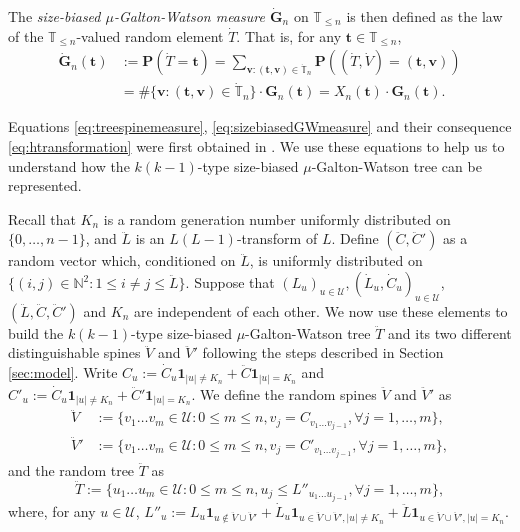 \documentclass[12pt,a4paper]{amsart}
\numberwithin{equation}{section}
\begin{document}
	The \emph{size-biased $\mu$-Galton-Watson measure $\dot {\mathbf G}_n$} on $\mathbb T_{\leq n}$ is then defined as the law of the $\mathbb T_{\leq n}$-valued random element $\dot T$. That is, for any $ \mathbf t \in\mathbb T_{\leq n}$,
\begin{equation}
\label{eq:sizebiasedGWmeasure}
\begin{split}
		\dot {\mathbf G}_n( \mathbf t )
	&:= \mathbf P(\dot T= \mathbf t )
	= \sum_{ \mathbf v:( \mathbf t , \mathbf v)\in \dot{\mathbb T}_n} \mathbf P((\dot T,\dot V)=( \mathbf t , \mathbf v))
	\\&= \#\{ \mathbf v:( \mathbf t , \mathbf v)\in \dot{\mathbb T}_n\} \cdot \mathbf G_n( \mathbf t )
	= X_n( \mathbf t ) \cdot \mathbf G_n( \mathbf t ).
\end{split}
\end{equation}

	Equations \eqref{eq:treespinemeasure}, \eqref{eq:sizebiasedGWmeasure} and their consequence \eqref{eq:htransformation} were first obtained in \cite{lyons1995conceptual}.
	We use these equations to help us to understand how the $k(k-1)$-type size-biased $\mu$-Galton-Watson tree can be represented.
	
	Recall that $K_n$ is a random generation number uniformly distributed on $\{0,\dots,n-1\}$, 
	and $\ddot L$ is an $L(L-1)$-transform of $L$.
	Define $(\ddot C,\ddot C')$ as a random vector which, conditioned on $\ddot L$, is uniformly distributed on $\{(i,j)\in\mathbb N^2:1\leq i\neq j\leq \ddot L\}$.
	Suppose that $(L_u)_{u\in\mathcal U}, (\dot L_u,\dot C_u)_{u\in \mathcal U}$, $(\ddot L,\ddot C,\ddot C')$ and $K_n$ are independent of each other.
	We now use these elements to build the $k(k-1)$-type size-biased $\mu$-Galton-Watson tree $\ddot T$ and its two different distinguishable spines $\ddot V$ and $\ddot V'$ following the steps described in Section \ref{sec:model}.
	Write $C_u:=\dot C_u\mathbf 1_{|u|\neq K_n}+\ddot C\mathbf 1_{|u|=K_n}$ and $C'_u:=\dot C_u\mathbf 1_{|u|\neq K_n}+\ddot C'\mathbf 1_{|u|=K_n}$.
	We define the random spines $\ddot V$ and $\ddot V'$ as
\begin{align*}
        \ddot V
	&:= \{v_1\dots v_m\in \mathcal U:0\le m\le n, v_j= C_{v_1\dots v_{j-1}},\forall j=1,\dots,m\},
	\\ \ddot V'
	&:= \{v_1\dots v_m\in \mathcal U:0\le m \le n, v_j= C'_{v_1\dots v_{j-1}},\forall j=1,\dots,m\},
\end{align*}
	and the random tree $\ddot T$ as
\begin{equation*}
	    \ddot T
	:=
		\{u_1\dots u_m\in\mathcal U: 0\le m\le n,u_j\leq L''_{u_1\dots u_{j-1}},\forall j=1,\dots,m\},
\end{equation*}
	where, for any $u\in\mathcal U$, $L''_u:=L_u \mathbf 1_{u\not\in \ddot V\cup\ddot V'}+\dot L_u \mathbf 1_{u\in \ddot V\cup\ddot V',|u|\neq K_n}+\ddot L\mathbf 1_{u\in \ddot V\cup\ddot V',|u|=K_n}$.
\end{document}
